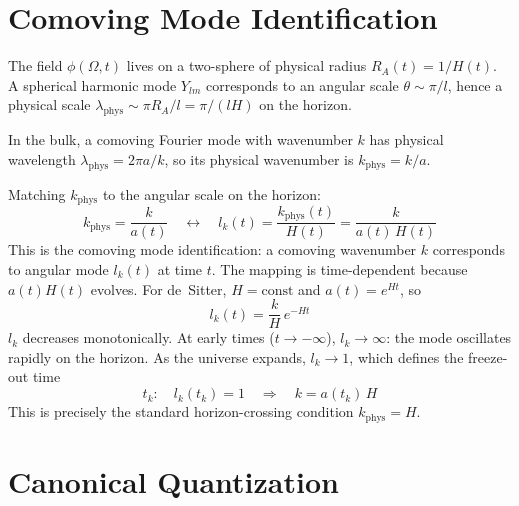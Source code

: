\documentclass[12pt,a4paper]{article}
\begin{document}
\section{Comoving Mode Identification}

The field $\phi(\Omega, t)$ lives on a two-sphere of physical radius $R_A(t) = 1/H(t)$. A spherical harmonic mode $Y_{lm}$ corresponds to an angular scale $\theta \sim \pi / l$, hence a physical scale $\lambda_\text{phys} \sim \pi R_A / l = \pi / (lH)$ on the horizon.

In the bulk, a comoving Fourier mode with wavenumber $k$ has physical wavelength $\lambda_\text{phys} = 2\pi a / k$, so its physical wavenumber is $k_\text{phys} = k/a$.

Matching $k_\text{phys}$ to the angular scale on the horizon:
\begin{equation}
k_\text{phys} = \frac{k}{a(t)} \quad \longleftrightarrow \quad l_k(t) = \frac{k_\text{phys}(t)}{H(t)} = \frac{k}{a(t)\,H(t)} \tag{2}
\end{equation}
This is the comoving mode identification: a comoving wavenumber $k$ corresponds to angular mode $l_k(t)$ at time $t$. The mapping is time-dependent because $a(t)H(t)$ evolves. For de~Sitter, $H = \text{const}$ and $a(t) = e^{Ht}$, so
\begin{equation}
l_k(t) = \frac{k}{H}\,e^{-Ht} \tag{3}
\end{equation}
$l_k$ decreases monotonically. At early times ($t \to -\infty$), $l_k \to \infty$: the mode oscillates rapidly on the horizon. As the universe expands, $l_k \to 1$, which defines the freeze-out time
\begin{equation}
t_k: \quad l_k(t_k) = 1 \quad \Longrightarrow \quad k = a(t_k)\,H \tag{4}
\end{equation}
This is precisely the standard horizon-crossing condition $k_\text{phys} = H$.

\section{Canonical Quantization}
\end{document}
